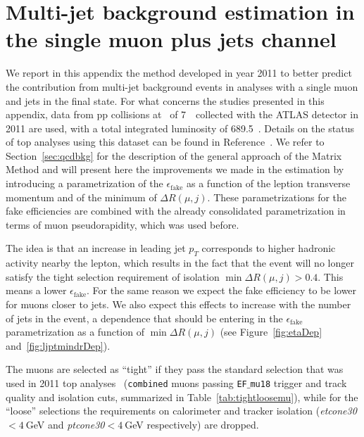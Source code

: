 \clearpage{\pagestyle{empty}\cleardoublepage}

\chapter{Multi-jet background estimation in the single muon plus jets channel}\label{app:qcdmm}

We report in this appendix the method developed in year 2011 to better predict
the contribution from multi-jet background events in analyses with a single
muon and jets in the final state. 
For what concerns the studies presented in this appendix, data
from pp collisions at \cme\ of 7~\tev\ collected with the ATLAS
detector in 2011 are used, with a total integrated luminosity
of 689.5~\ipb. Details on the status of top analyses
using this dataset can be found in Reference~\cite{topCommonObjects2012}.
We refer to Section~\ref{sec:qcdbkg}
for the description of the general approach of the
Matrix Method and will present here the improvements we
made in the estimation by introducing a parametrization of
the $\epsilon_\mathrm{fake}$ as a function of the leption
transverse momentum and of the minimum of $\Delta R(\mu,j)$.
These parametrizations for the fake efficiencies 
are combined with the already consolidated parametrization
in terms of muon pseudorapidity, which was used before.


The idea is that an increase in leading jet $p_T$ corresponds 
to higher hadronic activity nearby the lepton, 
which results in the fact that the event will no 
longer satisfy the tight selection requirement of 
isolation $\min\Delta R(\mu,j)>0.4$. This means a lower 
$\epsilon_\mathrm{fake}$. For the same reason we expect 
the fake efficiency to be lower for muons closer to jets.
We also expect this effects to increase with the number of 
jets in the event, a dependence that should be entering
in the $\epsilon_\mathrm{fake}$ parametrization as a function
of $\min\Delta R(\mu,j)$ (see Figure~\ref{fig:etaDep} and~\ref{fig:ljptmindrDep}). 

The muons are selected as ``tight'' if they pass the standard selection 
that was used in 2011 top analyses~\cite{topCommonObjects2012} 
(\texttt{combined} muons
passing {\tt EF$\_$mu18} trigger and track quality and isolation cuts,
summarized in Table~\ref{tab:tightloosemu}), while for the ``loose'' 
selections the requirements on calorimeter and tracker isolation
(\textit{etcone30}$<4~$GeV and \textit{ptcone30}$<4~$GeV respectively) 
are dropped.


